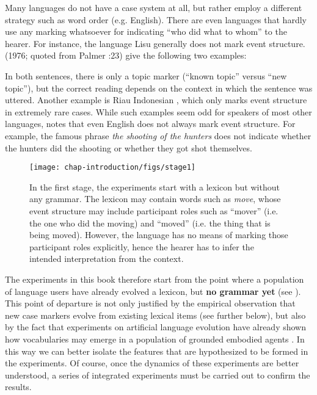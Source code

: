 Many languages do not have a case system at all, but rather employ a different strategy such as word order (e.g. English). There are even languages that hardly use any marking whatsoever for indicating ``who did what to whom'' to the hearer. For instance, the language Lisu generally does not mark event structure. \citeauthor{li76subject} (1976; quoted from Palmer \citeyear{palmer94grammatical}:23) give the following two examples:

\eal
{}
\zl

In both sentences, there is only a topic marker (``known topic'' versus ``new topic''), but the correct reading depends on the context in which the sentence was uttered. Another example is Riau Indonesian \citep{gil08how}, which only marks event structure in extremely rare cases. While such examples seem odd for speakers of most other languages, \citet[23]{palmer94grammatical} notes that even English does not always mark event structure. For example, the famous phrase {\em the shooting of the hunters} does not indicate whether the hunters did the shooting or whether they got shot themselves.

\begin{figure}[t]
\centerline{\texttt{[image: chap-introduction/figs/stage1]}}
    \caption[Formation of case markers: stage II]{In the first stage, the experiments start with a lexicon but without any grammar. The lexicon may contain words such as {\em move}, whose event structure may include participant roles such as ``mover'' (i.e. the one who did the moving) and ``moved'' (i.e. the thing that is being moved). However, the language has no means of marking those participant roles explicitly, hence the hearer has to infer the intended interpretation from the context.}
      \label{f:stage1}
\end{figure}

The experiments in this book therefore start from the point where a population of language users have already evolved a lexicon, but {\bfseries no grammar yet} (see ). This point of departure is not only justified by the empirical observation that new case markers evolve from existing lexical items (see further below), but also by the fact that experiments on artificial language evolution have already shown how vocabularies may emerge in a population of grounded embodied agents \citep[e.g.][]{steels96emergent, steels96selforganizing, steels97selforganizing}. In this way we can better isolate the features that are hypothesized to be formed in the experiments. Of course, once the dynamics of these experiments are better understood, a series of integrated experiments must be carried out to confirm the results.

